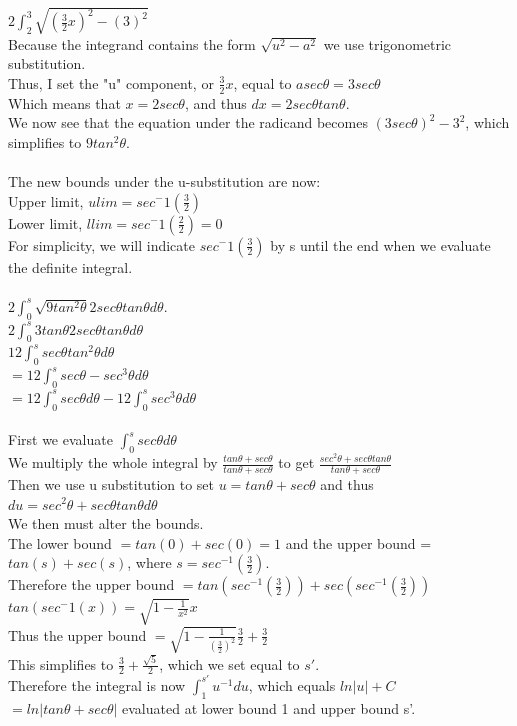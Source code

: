 \documentclass[11pt, oneside]{article}   	%
\begin{document}
\noindent $2 \int_2^3 \sqrt{(\frac{3}{2}x)^2-(3)^2}$\\
Because the integrand contains the form $\sqrt{u^2 - a^2}$ we use trigonometric substitution.\\
Thus, I set the "u" component, or $\frac{3}{2}x$, equal to $asec{\theta} = 3sec{\theta}$\\
Which means that $x = 2sec\theta$, and thus $dx = 2sec\theta tan\theta$.\\
We now see that the equation under the radicand becomes $(3sec\theta)^2 - 3^2$, which simplifies to $9tan^2\theta$.\\~\\
The new bounds under the u-substitution are now:\\
Upper limit, $ulim = sec^-1(\frac{3}{2})$\\ 
Lower limit, $llim = sec^-1(\frac{2}{2}) = 0$\\
For simplicity, we will indicate $sec^-1(\frac{3}{2})$ by s until the end when we evaluate the definite integral.\\~\\
$2\int_0^s \sqrt{9tan^2\theta} \left.2sec\theta tan\theta \right. d\theta$.\\
$2\int_0^s 3tan\theta 2sec\theta tan\theta d\theta$\\
$12\int_0^s sec\theta tan^2\theta d\theta$\\
$=12 \int_0^s sec\theta - sec^3\theta d\theta$\\
$=12 \int_0^s sec\theta d\theta - 12 \int_0^s sec^3\theta d\theta$\\~\\

\noindent First we evaluate $\int_0^s sec\theta d\theta$\\
We multiply the whole integral by $\frac{tan\theta + sec\theta}{tan\theta + sec\theta}$ to get $\frac{sec^2\theta + sec\theta tan\theta}{tan\theta + sec\theta}$\\
Then we use u substitution to set $u = tan\theta + sec \theta$ and thus $du = sec^2\theta + sec\theta tan\theta d\theta$\\
We then must alter the bounds.\\
The lower bound $ = tan(0) + sec(0) = 1$ and the upper bound = $tan(s) + sec(s)$, where $s = sec^{-1}(\frac{3}{2})$.\\
Therefore the upper bound $= tan(sec^{-1}(\frac{3}{2})) + sec(sec^{-1}(\frac{3}{2}))$\\
$tan(sec^-1(x)) = \sqrt{1 - \frac{1}{x^2}}x$\\
Thus the upper bound $=\sqrt{1 - \frac{1}{(\frac{3}{2})^2}}\frac{3}{2} + \frac{3}{2}$\\
This simplifies to $\frac{3}{2} + \frac{\sqrt{5}}{2}$, which we set equal to $s'$.\\
Therefore the integral is now $\int_1^{s'} u^{-1} du$, which equals $ln|u| + C$\\
$= ln|tan\theta + sec\theta|$ evaluated at lower bound 1 and upper bound s'.\\~\\
\end{document}
